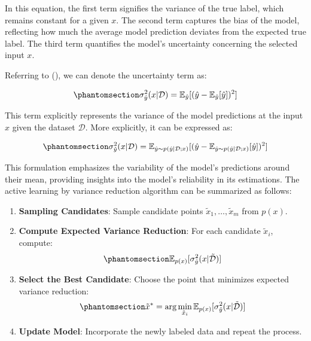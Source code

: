 \documentclass[
  letterpaper,
  numbers=noenddot,
  DIV=11]{scrreprt}
\providecommand{\tightlist}{%
  \setlength{\itemsep}{0pt}\setlength{\parskip}{0pt}}\usepackage{longtable,booktabs,array}
\theoremstyle{plain}
\theoremstyle{definition}
\theoremstyle{plain}
\theoremstyle{remark}
\begin{document}
In this equation, the first term signifies the variance of the true
label, which remains constant for a given \(x\). The second term
captures the bias of the model, reflecting how much the average model
prediction deviates from the expected true label. The third term
quantifies the model's uncertainty concerning the selected input \(x\).

Referring to (), we can denote the uncertainty term as:

\begin{equation}\phantomsection\label{eq-eq3.21}{
\sigma^2_{\hat{y}} (x | \mathcal{D}) = \mathbb{E}_{\hat{y}} [(\hat{y} - \mathbb{E}_{\hat{y}}[\hat{y}])^2]
}\end{equation}

This term explicitly represents the variance of the model predictions at
the input \(x\) given the dataset \(\mathcal{D}\). More explicitly, it
can be expressed as:

\begin{equation}\phantomsection\label{eq-eq3.22}{
\sigma^2_{\hat{y}} (x | \mathcal{D}) =  \mathbb{E}_{\hat{y} \sim p(\hat{y} | \mathcal{D}; x)} [(\hat{y} - \mathbb{E}_{\hat{y} \sim p(\hat{y} | \mathcal{D}; x)}[\hat{y}])^2]
}\end{equation}

This formulation emphasizes the variability of the model's predictions
around their mean, providing insights into the model's reliability in
its estimations. The active learning by variance reduction algorithm can
be summarized as follows:

\begin{enumerate}
\def\labelenumi{\arabic{enumi}.}
\tightlist
\item
  \textbf{Sampling Candidates}: Sample candidate points
  \(\tilde{x}_1, \dots, \tilde{x}_m\) from \(p(x)\).
\item
  \textbf{Compute Expected Variance Reduction}: For each candidate
  \(\tilde{x}_i\), compute:
  \begin{equation}\phantomsection\label{eq-eq3.23}{
  \mathbb{E}_{p(x)} [\sigma^2_{\hat{y}} (x | \tilde{\mathcal{D}})]
  }\end{equation}
\item
  \textbf{Select the Best Candidate}: Choose the point that minimizes
  expected variance reduction:
  \begin{equation}\phantomsection\label{eq-eq3.24}{
     \tilde{x}^* = \arg\min_{\tilde{x}_i} \mathbb{E}_{p(x)} [\sigma^2_{\hat{y}} (x | \tilde{\mathcal{D}})]
  }\end{equation}
\item
  \textbf{Update Model}: Incorporate the newly labeled data and repeat
  the process.
\end{enumerate}
\end{document}
